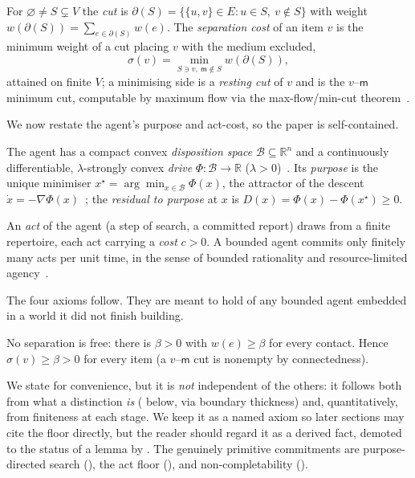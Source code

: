 \documentclass[11pt,twocolumn,a4paper]{article}
\newcommand{\R}{\mathbb{R}}
\newcommand{\V}{V}
\newcommand{\E}{E}
\newcommand{\wt}{w}
\newcommand{\med}{\mathsf{m}}
\newcommand{\flo}{\beta}
\newcommand{\cut}{\partial}
\newcommand{\str}{\sigma}
\newcommand{\Purp}{x^{\star}}
\newcommand{\Beh}{\mathcal{B}}       %
\newcommand{\drive}{\Phi}
\newcommand{\cost}{c}
\newcommand{\dem}{D}
\begin{document}
\begin{definition}
\label{def:cut}
For $\varnothing\neq S\subsetneq\V$ the \emph{cut} is
$\cut(S)=\{\{u,v\}\in\E: u\in S,\ v\notin S\}$ with weight
$\wt(\cut(S))=\sum_{e\in\cut(S)}\wt(e)$. The \emph{separation cost} of an
item $v$ is the minimum weight of a cut placing $v$ with the medium
excluded,
\[
\str(v)=\min_{S\ni v,\ \med\notin S}\wt(\cut(S)),
\]
attained on finite $\V$; a minimising side is a \emph{resting cut} of $v$
and is the $v$--$\med$ minimum cut, computable by maximum flow via the
max-flow/min-cut theorem~\cite{fordfulkerson1956,menger1927}.
\end{definition}

We now restate the agent's purpose and act-cost, so the paper is
self-contained.

\begin{definition}
\label{def:purpose}
The agent has a compact convex \emph{disposition space}
$\Beh\subseteq\R^n$ and a continuously differentiable, $\lambda$-strongly
convex \emph{drive} $\drive:\Beh\to\R$ ($\lambda>0$)~\cite{%
boydvandenberghe2004}. Its \emph{purpose} is the unique minimiser
$\Purp=\arg\min_{x\in\Beh}\drive(x)$, the attractor of the descent
$\dot x=-\nabla\drive(x)$~\cite{khalil2002}; the \emph{residual to purpose}
at $x$ is $\dem(x)=\drive(x)-\drive(\Purp)\ge0$.
\end{definition}

\begin{definition}
\label{def:act}
An \emph{act} of the agent (a step of search, a committed report) draws from
a finite repertoire, each act carrying a \emph{cost} $\cost>0$. A bounded
agent commits only finitely many acts per unit time, in the sense of
bounded rationality and resource-limited agency~\cite{simon1955,simon1996,%
russellnorvig2020}.
\end{definition}

The four axioms follow. They are meant to hold of any bounded agent
embedded in a world it did not finish building.

\begin{axiom}
\label{ax:distfloor}
No separation is free: there is $\flo>0$ with $\wt(e)\ge\flo$ for every
contact. Hence $\str(v)\ge\flo>0$ for every item (a $v$--$\med$ cut is
nonempty by connectedness).
\end{axiom}

\begin{remark}
\label{rem:floor-not-independent}
We state  for convenience, but it is \emph{not}
independent of the others: it follows both from what a distinction
\emph{is} ( below, via boundary thickness) and,
quantitatively, from finiteness at each stage. We keep it as a named axiom
so later sections may cite the floor directly, but the reader should regard
it as a derived fact, demoted to the status of a lemma by
. The genuinely primitive commitments are
purpose-directed search (), the act floor
(), and non-completability ().
\end{remark}
\end{document}

